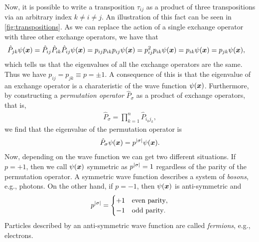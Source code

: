         Now, it is possible to write a transposition $\tau_{ij}$ as a product of
        three transpositions via an arbitrary index $k \neq i \neq j$.
        An illustration of this fact can be seen in
        \autoref{fig:transpositions}.
        As we can replace the action of a single exchange operator with three
        other exchange operators, we have that
        \begin{align}
            \hat{P}_{jk} \psi(\boldsymbol{x})
            &= \hat{P}_{ij} \hat{P}_{ik} \hat{P}_{ij} \psi(\boldsymbol{x})
            = p_{ij} p_{ik} p_{ij} \psi(\boldsymbol{x})
            = p_{ij}^2 p_{ik} \psi(\boldsymbol{x})
            = p_{ik} \psi(\boldsymbol{x})
             = p_{jk} \psi(\boldsymbol{x}),
        \end{align}
        which tells us that the eigenvalues of all the exchange operators are
        the same.
        Thus we have $p_{ij} = p_{jk} \equiv p = \pm 1$.
        A consequence of this is that the eigenvalue of an exchange operator is
        a charateristic of the wave function $\psi(\boldsymbol{x})$.
        Furthermore, by constructing a \emph{permutation operator}
        $\hat{P}_{\sigma}$ as a product of exchange operators, that is,
        \begin{align}
            \hat{P}_{\sigma}
            = \prod_{k = 1}^{n} \hat{P}_{i_k j_k},
        \end{align}
        we find that the eigenvalue of the permutation operator is
        \begin{align}
            \hat{P}_{\sigma}\psi(\boldsymbol{x})
            = p^{\abs{\sigma}}\psi(\boldsymbol{x}).
        \end{align}
        Now, depending on the wave function we can get two different situations.
        If $p = +1$, then we call $\psi(\boldsymbol{x})$ symmetric as $p^{\abs{\sigma}}
        = 1$ regardless of the parity of the permutation operator.
        A symmetric wave function describes a system of \emph{bosons}, e.g.,
        photons.
        On the other hand, if $p = -1$, then $\psi(\boldsymbol{x})$ is anti-symmetric
        and
        \begin{align}
            p^{\abs{\sigma}} =
            \begin{cases}
                +1 & \text{even parity}, \\
                -1 & \text{odd parity}.
            \end{cases}
        \end{align}
        Particles described by an anti-symmetric wave function are called
        \emph{fermions}, e.g., electrons.


